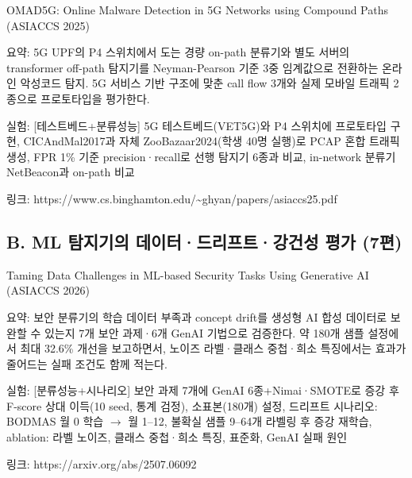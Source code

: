 \par\noindent \textbullet\enspace OMAD5G: Online Malware Detection in 5G Networks using Compound Paths (ASIACCS 2025)

\par\noindent \textbullet\enspace 요약: 5G UPF의 P4 스위치에서 도는 경량 on-path 분류기와 별도 서버의 transformer off-path 탐지기를 Neyman-Pearson 기준 3중 임계값으로 전환하는 온라인 악성코드 탐지. 5G 서비스 기반 구조에 맞춘 call flow 3개와 실제 모바일 트래픽 2종으로 프로토타입을 평가한다.


\par\noindent \textbullet\enspace 실험: [테스트베드+\allowbreak{}분류성능] 5G 테스트베드(VET5G)와 P4 스위치에 프로토타입 구현, CICAndMal2017과 자체 ZooBazaar2024(학생 40명 실행)로 PCAP 혼합 트래픽 생성, FPR 1\% 기준 precision·recall로 선행 탐지기 6종과 비교, in-network 분류기 NetBeacon과 on-path 비교


\par\noindent \textbullet\enspace 링크: https:/\allowbreak{}/\allowbreak{}www.cs.binghamton.edu/\allowbreak{}\textasciitilde{}ghyan/\allowbreak{}papers/\allowbreak{}asiaccs25.pdf



\subsection{B. ML 탐지기의 데이터·드리프트·강건성 평가 (7편)}
\par\noindent \textbullet\enspace Taming Data Challenges in ML-based Security Tasks Using Generative AI (ASIACCS 2026)

\par\noindent \textbullet\enspace 요약: 보안 분류기의 학습 데이터 부족과 concept drift를 생성형 AI 합성 데이터로 보완할 수 있는지 7개 보안 과제·6개 GenAI 기법으로 검증한다. 약 180개 샘플 설정에서 최대 32.6\% 개선을 보고하면서, 노이즈 라벨·클래스 중첩·희소 특징에서는 효과가 줄어드는 실패 조건도 함께 적는다.


\par\noindent \textbullet\enspace 실험: [분류성능+\allowbreak{}시나리오] 보안 과제 7개에 GenAI 6종+\allowbreak{}Nimai·SMOTE로 증강 후 F-score 상대 이득(10 seed, 통계 검정), 소표본(180개) 설정, 드리프트 시나리오: BODMAS 월 0 학습 \ensuremath{\rightarrow} 월 1–12, 불확실 샘플 9–64개 라벨링 후 증강 재학습, ablation: 라벨 노이즈, 클래스 중첩·희소 특징, 표준화, GenAI 실패 원인


\par\noindent \textbullet\enspace 링크: https:/\allowbreak{}/\allowbreak{}arxiv.org/\allowbreak{}abs/\allowbreak{}2507.06092




